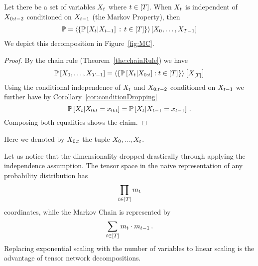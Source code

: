 \begin{theorem}\label{the:MarkovChain}
	Let there be a set of variables $X_{t}$ where $t\in[T]$.
	When $X_{t}$ is independent of $X_{0:{t-2}}$ conditioned on $X_{t-1}$ (the Markov Property), then
	\begin{align*}
		\mathbb{P} = \left\langle \{ \mathbb{P}\left[X_{t}|X_{t-1}\right]\, : \, t\in[T] \}\right\rangle \left[ 
		X_{0},\ldots,X_{T-1}
		 \right] 
	\end{align*}	
	We depict this decomposition in Figure~\ref{fig:MC}.
\end{theorem}
\begin{proof}
	By the chain rule (Theorem~\ref{the:chainRule}) we have
	\begin{align*}
	 	\mathbb{P}\left[X_{0},\ldots,X_{T-1}\right]
		= \left\langle 
		\{ \mathbb{P}\left[X_{t}|X_{0:t}\right] : t\in[T] \}
		\right\rangle \left[ X_{[T]} \right]
	\end{align*}
	Using the conditional independence of $X_{t}$ and $X_{0:{t-2}}$ conditioned on $X_{t-1}$ we further have by Corollary~\ref{cor:conditionDropping}
		\[ \mathbb{P}\left[X_{t}|X_{0:t}=x_{0:t}\right]  = \mathbb{P}\left[X_{t}|X_{t-1}=x_{t-1}\right] \, .  \]
	Composing both equalities shows the claim.
\end{proof}

Here we denoted by $X_{0:t}$ the tuple $X_{0},...,X_{t}$.

\begin{remark}
	Let us notice that the dimensionality dropped drastically through applying the independence assumption.
	The tensor space in the naive representation of any probability distribution has
		\[ \prod_{t\in[T]} m_{t}\]
	coordinates, while the Markov Chain is represented by
		\[ \sum_{t\in[T]}  m_{t}\cdot m_{t-1} \, . \]
	Replacing exponential scaling with the number of variables to linear scaling is the advantage of tensor network decompositions.
\end{remark}


